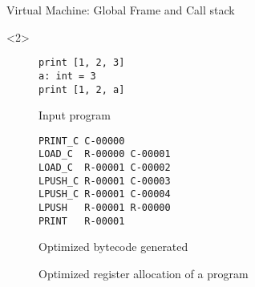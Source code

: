 \begin{frame}[fragile]{Virtual Machine: Global Frame and Call stack}
    \begin{onlyenv}<2>
        \begin{figure}[H]
	        \centering
            \begin{subtable}{0.3\textwidth}
                \begin{verbatim}
print [1, 2, 3]
a: int = 3
print [1, 2, a]
                \end{verbatim}
		    \caption{Input program}
	        \end{subtable}
	        \begin{subtable}{0.6\textwidth}
                \begin{verbatim}
PRINT_C C-00000
LOAD_C  R-00000 C-00001
LOAD_C  R-00001 C-00002
LPUSH_C R-00001 C-00003
LPUSH_C R-00001 C-00004
LPUSH   R-00001 R-00000
PRINT   R-00001
                \end{verbatim}
            \caption{Optimized bytecode generated}
	        \end{subtable}
        \caption{Optimized register allocation of a program}
        \end{figure}
    \end{onlyenv}
\end{frame}
